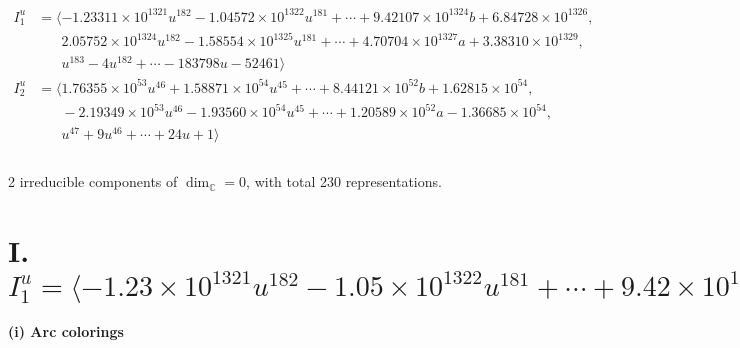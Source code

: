 \documentclass[1p]{elsarticle_modified}
\theoremstyle{definition}
\begin{document}
\begin{align*}
I^u_{1}&=\langle 
-1.23311\times10^{1321} u^{182}-1.04572\times10^{1322} u^{181}+\cdots+9.42107\times10^{1324} b+6.84728\times10^{1326},\\
\phantom{I^u_{1}}&\phantom{= \langle  }2.05752\times10^{1324} u^{182}-1.58554\times10^{1325} u^{181}+\cdots+4.70704\times10^{1327} a+3.38310\times10^{1329},\\
\phantom{I^u_{1}}&\phantom{= \langle  }u^{183}-4 u^{182}+\cdots-183798 u-52461\rangle \\
I^u_{2}&=\langle 
1.76355\times10^{53} u^{46}+1.58871\times10^{54} u^{45}+\cdots+8.44121\times10^{52} b+1.62815\times10^{54},\\
\phantom{I^u_{2}}&\phantom{= \langle  }-2.19349\times10^{53} u^{46}-1.93560\times10^{54} u^{45}+\cdots+1.20589\times10^{52} a-1.36685\times10^{54},\\
\phantom{I^u_{2}}&\phantom{= \langle  }u^{47}+9 u^{46}+\cdots+24 u+1\rangle \\
\\
\end{align*}
\raggedright * 2 irreducible components of $\dim_{\mathbb{C}}=0$, with total 230 representations.\\
\newpage
\renewcommand{\arraystretch}{1}
\centering \section*{I. $I^u_{1}= \langle -1.23\times10^{1321} u^{182}-1.05\times10^{1322} u^{181}+\cdots+9.42\times10^{1324} b+6.85\times10^{1326},\;2.06\times10^{1324} u^{182}-1.59\times10^{1325} u^{181}+\cdots+4.71\times10^{1327} a+3.38\times10^{1329},\;u^{183}-4 u^{182}+\cdots-183798 u-52461 \rangle$}
\flushleft \textbf{(i) Arc colorings}\\
\end{document}

